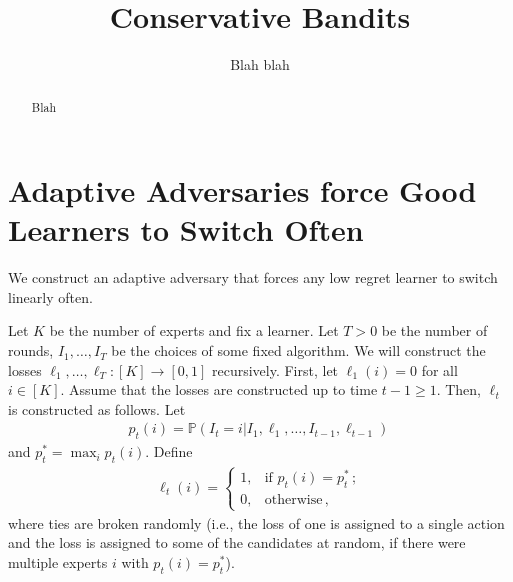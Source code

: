 \documentclass{article} %
\title{Conservative Bandits}
\author{
Blah blah
}
\renewcommand{\Pr}{\mathds{P}}
\newcommand{\Prob}[1]{\Pr\left( #1 \right)}
\theoremstyle{plain}
\theoremstyle{definition}
\theoremstyle{remark}
\begin{document}
\maketitle

\begin{abstract}
Blah 
\end{abstract}


\section{Adaptive Adversaries force Good Learners to Switch Often}
We construct an adaptive adversary that forces any low regret learner to switch linearly often.

Let $K$ be the number of experts and fix a learner.
Let $T>0$ be the number of rounds, $I_1,\dots, I_T$ be the choices of some fixed algorithm.
We will construct the losses $\ell_1,\dots,\ell_T: [K] \to [0,1]$ recursively.
First, let $\ell_1(i) = 0$ for all $i\in [K]$.
Assume that the losses are constructed up to time $t-1\ge 1$. Then, $\ell_t$ is constructed as follows.
Let
\begin{align*}
p_t(i) = \Prob{I_t = i|I_1,\ell_1, \dots, I_{t-1},\ell_{t-1} }\,
\end{align*}
and $p_t^* = \max_i p_t(i)$.
Define
\begin{align*}
\ell_t(i) = 
\begin{cases}
1, & \text{if } p_t(i) = p_t^*\,;\\
0, & \text{otherwise}\,,
\end{cases}
\end{align*}
where ties are broken randomly (i.e., the loss of one is assigned to a single action and the loss is assigned to some of the candidates at random, if there were multiple experts $i$ with $p_t(i) = p_t^*$).
\end{document}
